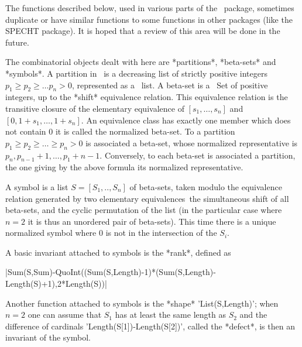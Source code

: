 

The  functions  described  below,  used  in  various  parts of the \CHEVIE\
package, sometimes duplicate or have similar functions to some functions in
other packages (like the SPECHT package). It is hoped that a review of this
area will be done in the future.

The combinatorial objects dealt with here are *partitions*, *beta-sets* and
*symbols*.  A  partition  in  \CHEVIE\  is  a  decreasing  list of strictly
positive  integers  $p_1\ge  p_2\ge  \ldots  p_n>0$, represented as a \GAP\
list.  A beta-set is  a \GAP\ Set  of positive integers,  up to the *shift*
equivalence  relation. This equivalence relation  is the transitive closure
of the elementary equivalence of $[s_1,\ldots,s_n]$ and
$[0,1+s_1,\ldots,1+s_n]$. An equivalence class has exactly one member which
does not contain $0$\: it is called the normalized beta-set. To a partition
$p_1\ge  p_2\ge\ldots\ge p_n>0$ is associated  a beta-set, whose normalized
representative   is  $p_n,p_{n-1}+1,\ldots,p_1+n-1$.  Conversely,  to  each
beta-set is associated a partition, the one giving by the above formula its
normalized representative.

A  symbol  is  a  list  $S=[S_1,..,S_n]$  of  beta-sets,  taken  modulo the
equivalence  relation  generated  by  two  elementary  equivalences\:\  the
simultaneous shift of all beta-sets, and the cyclic permutation of the list
(in  the  particular  case  where  $n=2$  it  is  thus an unordered pair of
beta-sets). This time there is a unique normalized symbol where 0 is not in
the intersection of the $S_i$.

A  basic invariant  attached to symbols is the *rank*, defined as

|Sum(S,Sum)-QuoInt((Sum(S,Length)-1)*(Sum(S,Length)-Length(S)+1),2*Length(S))|

Another  function attached to symbols is the *shape* 'List(S,Length)'; when
$n=2$  one can assume that $S_1$ has at  least the same length as $S_2$ and
the   difference  of  cardinals   'Length(S[1])-Length(S[2])',  called  the
*defect*, is then an invariant of the symbol.

